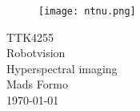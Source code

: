 \documentclass{article}
\begin{document}
\begin{titlepage}
      \begin{center}
        \begin{figure}[h!]
            \centering
            \texttt{[image: ntnu.png]}
            \label{fig:ntnu}
        \end{figure}
        \vspace*{1cm}
        {\Large{TTK4255}}\\[0.4cm] 
        \Huge{Robotvision}\\[0.5cm]
        {\Large{Hyperspectral imaging}\vspace*{0.5cm}\\ Mads Formo }\\[0.4cm] 
        \large{\today}
        \vspace{1cm}
    \end{center}
    \vspace*{\fill}
\end{titlepage}



\thispagestyle{empty} %
\linespread{1.15}
\newpage
\tableofcontents{}
\def\tableofcontentsname{test}
\thispagestyle{empty} %


\newpage
\setcounter{page}{1}
%











%


\newpage
{}
\printbibliography{}
\label{sec:references}
\end{document}
